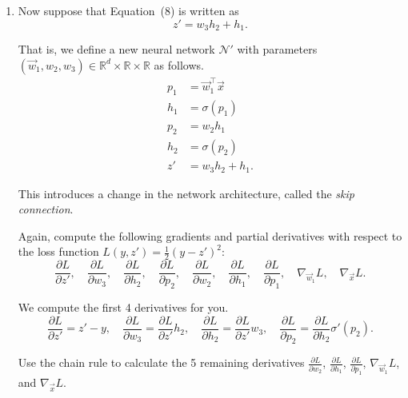 \documentclass[10pt]{article}
\theoremstyle{definition}
\theoremstyle{plain}
\newcommand{\RR}{\mathbb{R}}
\begin{document}
\begin{enumerate}[label=(\alph*)]
\item Now suppose that Equation~(8) is written as
\begin{equation}
z' = w_3 h_2 + h_1.
\end{equation}

That is, we define a new neural network $\mathcal{N}'$ with parameters $(\vec{w}_1, w_2, w_3) \in \RR^d \times \RR \times \RR$ as follows.
\begin{align}
p_1 &= \vec{w}_1^\top \vec{x} \\
h_1 &= \sigma(p_1) \\
p_2 &= w_2 h_1 \\
h_2 &= \sigma(p_2) \\
z' &= w_3 h_2 + h_1.
\end{align}

This introduces a change in the network architecture, called the \emph{skip connection}.

Again, compute the following gradients and partial derivatives with respect to the loss function $L(y, z') = \frac{1}{2}(y - z')^2$:
\begin{equation}
\frac{\partial L}{\partial z'}, \quad \frac{\partial L}{\partial w_3}, \quad \frac{\partial L}{\partial h_2}, \quad \frac{\partial L}{\partial p_2}, \quad \frac{\partial L}{\partial w_2}, \quad \frac{\partial L}{\partial h_1}, \quad \frac{\partial L}{\partial p_1}, \quad \nabla_{\vec{w}_1} L, \quad \nabla_{\vec{x}} L.
\end{equation}

We compute the first 4 derivatives for you.
\begin{equation}
\frac{\partial L}{\partial z'} = z' - y, \quad \frac{\partial L}{\partial w_3} = \frac{\partial L}{\partial z'} h_2, \quad \frac{\partial L}{\partial h_2} = \frac{\partial L}{\partial z'} w_3, \quad \frac{\partial L}{\partial p_2} = \frac{\partial L}{\partial h_2} \sigma'(p_2).
\end{equation}

Use the chain rule to calculate the 5 remaining derivatives $\frac{\partial L}{\partial w_2}$, $\frac{\partial L}{\partial h_1}$, $\frac{\partial L}{\partial p_1}$, $\nabla_{\vec{w}_1} L$, and $\nabla_{\vec{x}} L$.


\end{enumerate}
\end{document}
